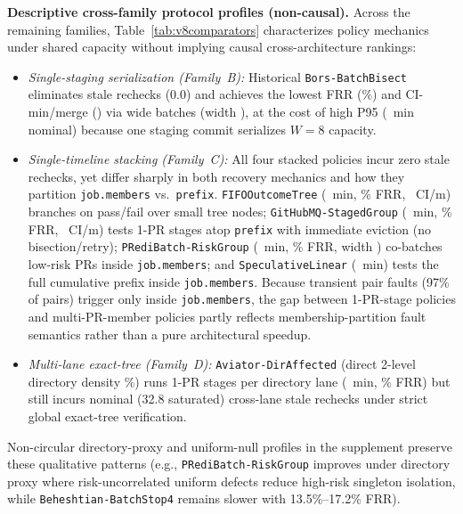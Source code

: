 \textbf{Descriptive cross-family protocol profiles (non-causal).} Across the remaining families, Table~\ref{tab:v8comparators} characterizes policy mechanics under shared capacity without implying causal cross-architecture rankings:
\begin{itemize}
\item \emph{Single-staging serialization (Family~B):} Historical \texttt{Bors-BatchBisect} eliminates stale rechecks (0.0) and achieves the lowest FRR (\BorsNomFrr{}\%) and CI-min/merge (\BorsNomCi{}) via wide batches (width \BorsNomWidth{}), at the cost of high P95 (\BorsNomP{}~min nominal) because one staging commit serializes $W{=}8$ capacity.
\item \emph{Single-timeline stacking (Family~C):} All four stacked policies incur zero stale rechecks, yet differ sharply in both recovery mechanics and how they partition \texttt{job.members} vs.\ \texttt{prefix}. \texttt{FIFOOutcomeTree} (\NomTreeP{}~min, \NomTreeFrr{}\% FRR, \NomTreeCi{}~CI/m) branches on pass/fail over small tree nodes; \texttt{GitHubMQ-StagedGroup} (\GhmqNomP{}~min, \GhmqNomFrr{}\% FRR, \GhmqNomCi{}~CI/m) tests 1-PR stages atop \texttt{prefix} with immediate eviction (no bisection/retry); \texttt{PRediBatch-RiskGroup} (\PbNomP{}~min, \PbNomFrr{}\% FRR, width \PbNomWidth{}) co-batches low-risk PRs inside \texttt{job.members}; and \texttt{SpeculativeLinear} (\LinNomP{}~min) tests the full cumulative prefix inside \texttt{job.members}. Because transient pair faults (97\% of pairs) trigger only inside \texttt{job.members}, the gap between 1-PR-stage policies and multi-PR-member policies partly reflects membership-partition fault semantics rather than a pure architectural speedup.
\item \emph{Multi-lane exact-tree (Family~D):} \texttt{Aviator-DirAffected} (direct 2-level directory density \DirTargetDensity{}\%) runs 1-PR stages per directory lane (\AviNomP{}~min, \AviNomFrr{}\% FRR) but still incurs \AviNomStale{} nominal (32.8 saturated) cross-lane stale rechecks under strict global exact-tree verification.
\end{itemize}
Non-circular directory-proxy and uniform-null profiles in the supplement preserve these qualitative patterns (e.g., \texttt{PRediBatch-RiskGroup} improves under directory proxy where risk-uncorrelated uniform defects reduce high-risk singleton isolation, while \texttt{Beheshtian-BatchStop4} remains slower with 13.5\%--17.2\% FRR).

